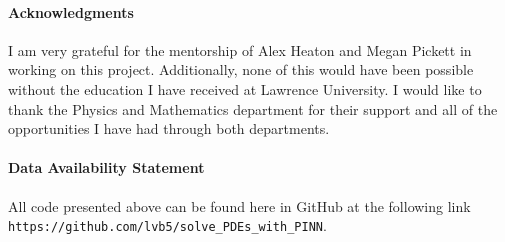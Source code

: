 \documentclass{CUP-JNL-DTM}%
\theoremstyle{definition}
\numberwithin{equation}{section}
\begin{document}
\begin{Backmatter}

\paragraph{Acknowledgments}

I am very grateful for the mentorship of Alex Heaton and Megan Pickett in working on this project. Additionally, none of this would have been possible without the education I have received at Lawrence University. I would like to thank the Physics and Mathematics department for their support and all of the opportunities I have had through both departments. 

\paragraph{Data Availability Statement} All code presented above can be found here in GitHub at the following link \texttt{https://github.com/lvb5/solve\_PDEs\_with\_PINN}. 




\end{Backmatter}
\end{document}
